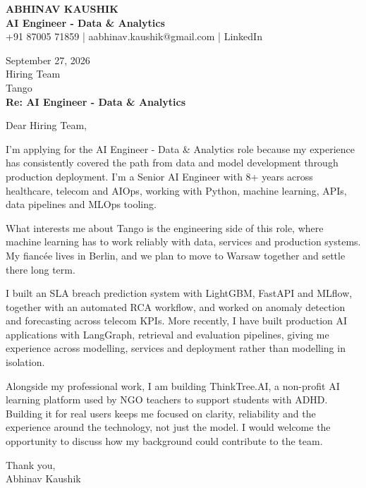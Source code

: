 \documentclass[10pt,a4paper]{article}
\begin{document}
\begin{center}
{\Large\bfseries ABHINAV KAUSHIK}\\[2pt]
{\bfseries AI Engineer - Data \& Analytics}\\[2pt]
+91 87005 71859 \quad | \quad aabhinav.kaushik@gmail.com \quad | \quad LinkedIn
\end{center}
\vspace{8pt}
September 27, 2026\\[6pt]
Hiring Team\\
Tango\\[4pt]
\textbf{Re: AI Engineer - Data \& Analytics}

Dear Hiring Team,

I’m applying for the AI Engineer - Data \& Analytics role because my experience has consistently covered the path from data and model development through production deployment. I’m a Senior AI Engineer with 8+ years across healthcare, telecom and AIOps, working with Python, machine learning, APIs, data pipelines and MLOps tooling.

What interests me about Tango is the engineering side of this role, where machine learning has to work reliably with data, services and production systems. My fiancée lives in Berlin, and we plan to move to Warsaw together and settle there long term.

I built an SLA breach prediction system with LightGBM, FastAPI and MLflow, together with an automated RCA workflow, and worked on anomaly detection and forecasting across telecom KPIs. More recently, I have built production AI applications with LangGraph, retrieval and evaluation pipelines, giving me experience across modelling, services and deployment rather than modelling in isolation.

Alongside my professional work, I am building ThinkTree.AI, a non-profit AI learning platform used by NGO teachers to support students with ADHD. Building it for real users keeps me focused on clarity, reliability and the experience around the technology, not just the model. I would welcome the opportunity to discuss how my background could contribute to the team.

Thank you,\\
Abhinav Kaushik
\end{document}
